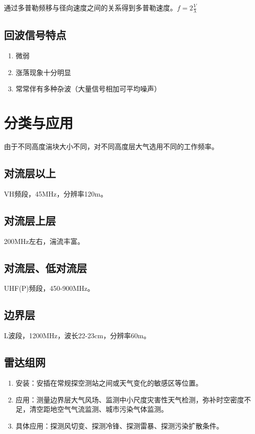 \documentclass[UTF8,11pt]{ctexbook}
\begin{document}
通过多普勒频移与径向速度之间的关系得到多普勒速度。\(f=2\frac{V}{\lambda}\)

\subsection{回波信号特点}
\begin{enumerate}
    \item 微弱
    \item 涨落现象十分明显
    \item 常常伴有多种杂波（大量信号相加可平均噪声）
\end{enumerate}

\section{分类与应用}

由于不同高度湍块大小不同，对不同高度层大气选用不同的工作频率。

\subsection{对流层以上}

VH频段，45MHz，分辨率120m。

\subsection{对流层上层}

200MHz左右，湍流丰富。

\subsection{对流层、低对流层}

UHF(P)频段，450-900MHz。

\subsection{边界层}

L波段，1200MHz，波长22-23cm，分辨率60m。


\subsection{雷达组网}
\begin{enumerate}
    \item 安装：安插在常规探空测站之间或天气变化的敏感区等位置。
    \item 应用：测量边界层大气风场、监测中小尺度灾害性天气检测，弥补时空密度不足，清空距地空气气流监测、城市污染气体监测。
    \item 具体应用：探测风切变、探测冷锋、探测雷暴、探测污染扩散条件。
\end{enumerate}
\end{document}

